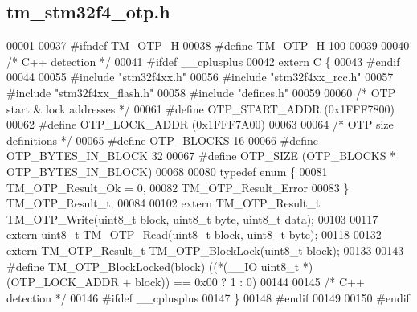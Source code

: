 \hypertarget{tm__stm32f4__otp_8h_source}{}\subsection{tm\+\_\+stm32f4\+\_\+otp.\+h}

\begin{DoxyCode}
00001 
00037 \textcolor{preprocessor}{#ifndef TM\_OTP\_H}
00038 \textcolor{preprocessor}{#define TM\_OTP\_H 100}
00039 
00040 \textcolor{comment}{/* C++ detection */}
00041 \textcolor{preprocessor}{#ifdef \_\_cplusplus}
00042 \textcolor{keyword}{extern} C \{
00043 \textcolor{preprocessor}{#endif}
00044 
00055 \textcolor{preprocessor}{#include "stm32f4xx.h"}
00056 \textcolor{preprocessor}{#include "stm32f4xx\_rcc.h"}
00057 \textcolor{preprocessor}{#include "stm32f4xx\_flash.h"}
00058 \textcolor{preprocessor}{#include "defines.h"}
00059 
00060 \textcolor{comment}{/* OTP start & lock addresses */}
00061 \textcolor{preprocessor}{#define OTP\_START\_ADDR      (0x1FFF7800)}
00062 \textcolor{preprocessor}{#define OTP\_LOCK\_ADDR       (0x1FFF7A00)}
00063     
00064 \textcolor{comment}{/* OTP size definitions */}
00065 \textcolor{preprocessor}{#define OTP\_BLOCKS          16}
00066 \textcolor{preprocessor}{#define OTP\_BYTES\_IN\_BLOCK  32}
00067 \textcolor{preprocessor}{#define OTP\_SIZE            (OTP\_BLOCKS * OTP\_BYTES\_IN\_BLOCK)}
00068 
00080 \textcolor{keyword}{typedef} \textcolor{keyword}{enum} \{
00081     TM\_OTP\_Result\_Ok = 0,
00082     TM\_OTP\_Result\_Error
00083 \} TM\_OTP\_Result\_t;
00084 
00102 \textcolor{keyword}{extern} TM\_OTP\_Result\_t TM\_OTP\_Write(uint8\_t block, uint8\_t byte, uint8\_t data);
00103 
00117 \textcolor{keyword}{extern} uint8\_t TM\_OTP\_Read(uint8\_t block, uint8\_t byte);
00118 
00132 \textcolor{keyword}{extern} TM\_OTP\_Result\_t TM\_OTP\_BlockLock(uint8\_t block);
00133 
00143 \textcolor{preprocessor}{#define TM\_OTP\_BlockLocked(block)   ((*(\_\_IO uint8\_t *) (OTP\_LOCK\_ADDR + block)) == 0x00 ? 1 : 0)}
00144 
00145 \textcolor{comment}{/* C++ detection */}
00146 \textcolor{preprocessor}{#ifdef \_\_cplusplus}
00147 \}
00148 \textcolor{preprocessor}{#endif}
00149 
00150 \textcolor{preprocessor}{#endif}
\end{DoxyCode}
